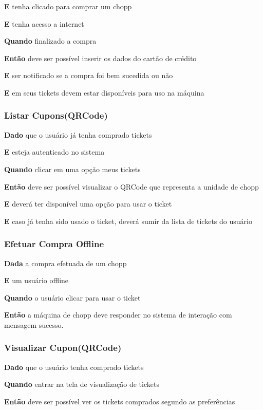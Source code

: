\textbf{E} tenha clicado para comprar um chopp

\textbf{E} tenha acesso a internet

\textbf{Quando} finalizado a compra

\textbf{Então} deve ser possível inserir os dados do cartão de crédito

\textbf{E} ser notificado se a compra foi bem sucedida ou não

\textbf{E} em seus tickets devem estar disponíveis para uso na máquina

\subsubsection{Listar Cupons(QRCode)}

\textbf{Dado} que o usuário já tenha comprado tickets

\textbf{E} esteja autenticado no sistema

\textbf{Quando} clicar em uma opção meus tickets

\textbf{Então} deve ser possível  visualizar o QRCode que representa a unidade de chopp

\textbf{E} deverá ter disponível uma opção para usar o ticket

\textbf{E} caso já tenha sido usado o ticket, deverá sumir da lista de tickets do usuário

\subsubsection{Efetuar Compra Offline}

\textbf{Dada} a compra efetuada de um chopp

\textbf{E} um usuário offline

\textbf{Quando} o usuário clicar para usar o ticket

\textbf{Então} a máquina de chopp deve responder no sistema de interação com mensagem sucesso.

\subsubsection{Visualizar Cupon(QRCode)}

\textbf{Dado} que o usuário tenha comprado tickets

\textbf{Quando} entrar na tela de visualização de tickets

\textbf{Então} deve ser possível ver os tickets comprados segundo as preferências


